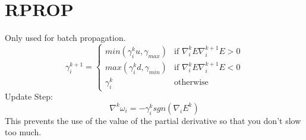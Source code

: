 \documentclass[letterpaper, 9pt]{article}
\begin{document}
\section{RPROP}
Only used for batch propagation.
\begin{equation}
\gamma_i^{k+1} =
\begin{cases}
min(\gamma_i^k u, \gamma_{max}) & \text{if } \nabla_i^kE \nabla_i^{k+1} E > 0 \\
max(\gamma_i^k d, \gamma_{min}) & \text{if } \nabla_i^kE \nabla_i^{k+1} E < 0 \\
\gamma_i^k & \text{otherwise}
\end{cases}
\end{equation}
Update Step:
\begin{equation}
\nabla^k \omega_i = -\gamma_i^k sgn(\nabla_i E^k)
\end{equation}
This prevents the use of the value of the partial derivative so that you don't slow too much.
\end{document}
